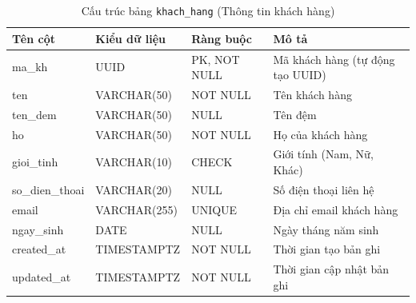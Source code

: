 \begin{table}[H]
  \centering
  \begin{tabularx}{\textwidth}{|l|l|l|>{\raggedright\arraybackslash}X|}
    \hline
    \textbf{Tên cột} & \textbf{Kiểu dữ liệu} & \textbf{Ràng buộc} & \textbf{Mô tả} \\
    \hline
    ma\_kh               & UUID            & PK, NOT NULL    & Mã khách hàng (tự động tạo UUID) \\ \hline
    ten                  & VARCHAR(50)     & NOT NULL        & Tên khách hàng \\ \hline
    ten\_dem             & VARCHAR(50)     & NULL            & Tên đệm \\ \hline
    ho                   & VARCHAR(50)     & NOT NULL        & Họ của khách hàng \\ \hline
    gioi\_tinh           & VARCHAR(10)     & CHECK           & Giới tính (Nam, Nữ, Khác) \\ \hline
    so\_dien\_thoai      & VARCHAR(20)     & NULL            & Số điện thoại liên hệ \\ \hline
    email                & VARCHAR(255)    & UNIQUE          & Địa chỉ email khách hàng \\ \hline
    ngay\_sinh           & DATE            & NULL            & Ngày tháng năm sinh \\ \hline
    created\_at          & TIMESTAMPTZ     & NOT NULL        & Thời gian tạo bản ghi \\ \hline
    updated\_at          & TIMESTAMPTZ     & NOT NULL        & Thời gian cập nhật bản ghi \\
    \hline
  \end{tabularx}
  \caption{Cấu trúc bảng \texttt{khach\_hang} (Thông tin khách hàng)}
  \label{tab:db-khach-hang}
\end{table}


